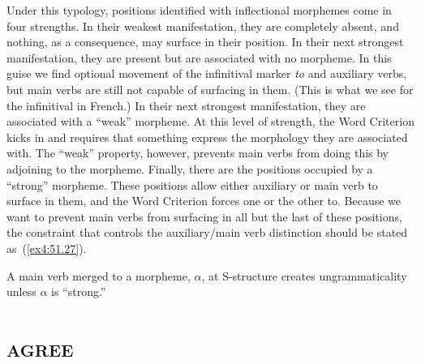 Under this typology,  positions identified with inflectional morphemes come in four strengths. In their weakest manifestation, they are completely absent, and nothing, as a consequence, may surface in their position. In their next strongest manifestation, they are present but are associated with no morpheme. In this guise we find optional movement of the infinitival marker \emph{to} and auxiliary verbs, but main verbs are still not capable of surfacing in them. (This is what we see for the infinitival  in French.) In their next strongest manifestation, they are associated with a ``weak'' morpheme. At this level of strength, the Word Criterion kicks in and requires that something express the morphology they are associated with. The ``weak'' property, however, prevents main verbs from doing this by adjoining to the morpheme. Finally, there are the  positions occupied by a ``strong'' morpheme. These positions allow either auxiliary or main verb to surface in them, and the Word Criterion forces one or the other to. Because we want to prevent main verbs from surfacing in all but the last of these positions, the constraint that controls the auxiliary/main verb distinction should be stated as~(\ref{ex4:51.27}).%
\begin{exe}
	\ex \label{ex4:51.27} A main verb merged to a morpheme, $\alpha$, at {S-structure} creates ungrammaticality unless $\alpha$ is ``strong.''%
\end{exe}

\section{\textsc{agree}}

